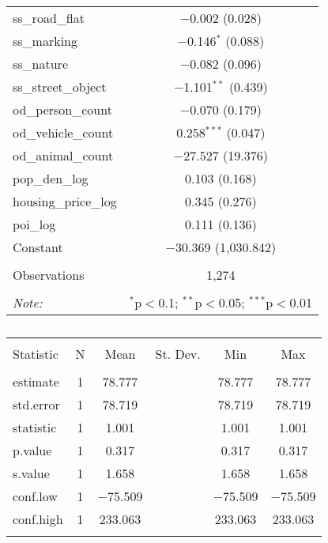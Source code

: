 \begin{table}[!htbp]
\begin{tabular}{@{\extracolsep{1pt}}lc}
  ss\_road\_flat & $-$0.002 (0.028) \\ 
  ss\_marking & $-$0.146$^{*}$ (0.088) \\ 
  ss\_nature & $-$0.082 (0.096) \\ 
  ss\_street\_object & $-$1.101$^{**}$ (0.439) \\ 
  od\_person\_count & $-$0.070 (0.179) \\ 
  od\_vehicle\_count & 0.258$^{***}$ (0.047) \\ 
  od\_animal\_count & $-$27.527 (19.376) \\ 
  pop\_den\_log & 0.103 (0.168) \\ 
  housing\_price\_log & 0.345 (0.276) \\ 
  poi\_log & 0.111 (0.136) \\ 
  Constant & $-$30.369 (1,030.842) \\ 
 \hline \\[-1.8ex] 
Observations & 1,274 \\ 
\hline 
\hline \\[-1.8ex] 
\textit{Note:}  & \multicolumn{1}{r}{$^{*}$p$<$0.1; $^{**}$p$<$0.05; $^{***}$p$<$0.01} \\ 
\end{tabular} 
\end{table} 

\begin{table}[!htbp] \centering 
  \caption{} 
  \label{} 
\small 
\begin{tabular}{@{\extracolsep{1pt}}lccccc} 
\\[-1.8ex]\hline 
\hline \\[-1.8ex] 
Statistic & \multicolumn{1}{c}{N} & \multicolumn{1}{c}{Mean} & \multicolumn{1}{c}{St. Dev.} & \multicolumn{1}{c}{Min} & \multicolumn{1}{c}{Max} \\ 
\hline \\[-1.8ex] 
estimate & 1 & 78.777 &  & 78.777 & 78.777 \\ 
std.error & 1 & 78.719 &  & 78.719 & 78.719 \\ 
statistic & 1 & 1.001 &  & 1.001 & 1.001 \\ 
p.value & 1 & 0.317 &  & 0.317 & 0.317 \\ 
s.value & 1 & 1.658 &  & 1.658 & 1.658 \\ 
conf.low & 1 & $-$75.509 &  & $-$75.509 & $-$75.509 \\ 
conf.high & 1 & 233.063 &  & 233.063 & 233.063 \\ 
\hline \\[-1.8ex] 
\end{tabular} 
\end{table} 

